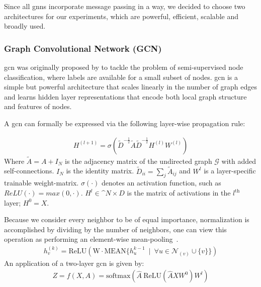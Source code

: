 Since all \acp{gnn} incorporate message passing in a way, we decided to choose two architectures for our experiments, which are powerful, efficient, scalable and broadly used.
\subsubsection{Graph Convolutional Network (GCN)}
\label{sec:related:architectures:gcn}
\Acf{gcn} was originally proposed by \citet{Kipf2017} to tackle the problem of semi-supervised node classification, where labels are available for a small subset of nodes.
\Ac{gcn} is a simple but powerful architecture that scales linearly in the number of graph edges and learns hidden layer representations that encode both local graph structure and features of nodes.

A \ac{gcn} can formally be expressed via the following layer-wise propagation rule:

\begin{align*}
    H^{(l+1)} = \sigma (\tilde{D}^{-\frac{1}{2}}\tilde{A}\tilde{D}^{-\frac{1}{2}} H^{(l)}W^{(l)})
\end{align*}
Where $\tilde{A} = A + I_{N}$ is the adjacency matrix of the undirected graph $\mathcal{G}$
with added self-connections. $I_{N}$ is the identity matrix. $\tilde{D}_{ii} = \sum_{j}\tilde{A}_{ij}$ and $W^{l}$ is a layer-specific trainable weight-matrix. $\sigma(\cdot)$ denotes an activation function, such as $ReLU(\cdot) = max(0, \cdot)$. $ H^{l}\in  \mathbb^{N \times D}$ is the matrix of activations in the
$l^{\mathrm{th}}$ layer; $H^{0}= X$.

Because we consider every neighbor to be of equal importance, normalization is accomplished
by dividing by the number of neighbors, one can view this operation as performing an element-wise
mean-pooling~\cite{Xu2019}.
\begin{align*}
    h_{v}^{(k)} = \mathrm{ReLU}(\mathrm{W} \cdot\mathrm{MEAN} \{h_{u}^{k-1}\ \mid \ \forall{u} \in \mathcal{N}_{(v)} \cup \{v\}\})
\end{align*}
An application of a two-layer \ac{gcn} is given by:
\begin{align*}
    Z = f(X,A) = \mathrm{softmax} (\hat{A}\ \mathrm{ReLU}(\hat{A}XW^{0})W^{l})
\end{align*}

